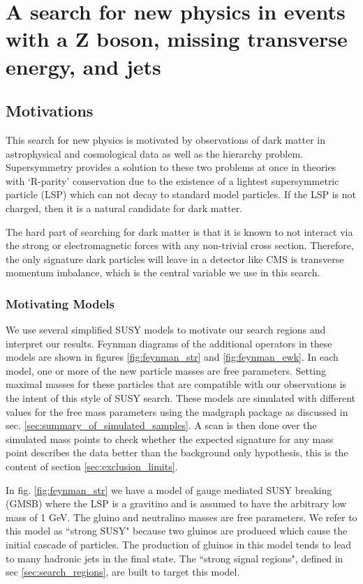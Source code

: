 \chapter{A search for new physics in events with a Z boson, missing transverse energy, and jets}

\section{Motivations}

  This search for new physics is motivated by observations of dark matter in astrophysical and cosmological data as well as the hierarchy problem. Supersymmetry provides a solution to these two problems at once in theories with `R-parity' conservation due to the existence of a lightest supersymmetric particle (LSP) which can not decay to standard model particles. If the LSP is not charged, then it is a natural candidate for dark matter. 

  The hard part of searching for dark matter is that it is known to not interact via the strong or electromagnetic forces with any non-trivial cross section. Therefore, the only signature dark particles will leave in a detector like CMS is transverse momentum imbalance, which is the central variable we use in this search.

  \subsection{Motivating Models} \label{sec:susy_models}

  We use several simplified SUSY models to motivate our search regions and interpret our results. Feynman diagrams of the additional operators in these models are shown in figures \ref{fig:feynman_str} and \ref{fig:feynman_ewk}. In each model, one or more of the new particle masses are free parameters. Setting maximal masses for these particles that are compatible with our observations is the intent of this style of SUSY search. These models are simulated with different values for the free mass parameters using the madgraph package as discussed in sec. \ref{sec:summary_of_simulated_samples}. A scan is then done over the simulated mass points to check whether the expected signature for any mass point describes the data better than the background only hypothesis, this is the content of section \ref{sec:exclusion_limits}.

  In fig. \ref{fig:feynman_str} we have a model of gauge mediated SUSY breaking (GMSB) where the LSP is a gravitino and is assumed to have the arbitrary low mass of 1 GeV. The gluino and neutralino masses are free parameters. We refer to this model as ``strong SUSY" because two gluinos are produced which cause the initial cascade of particles. The production of gluinos in this model tends to lead to many hadronic jets in the final state. The ``strong signal regions", defined in sec \ref{sec:search_regions}, are built to target this model.

